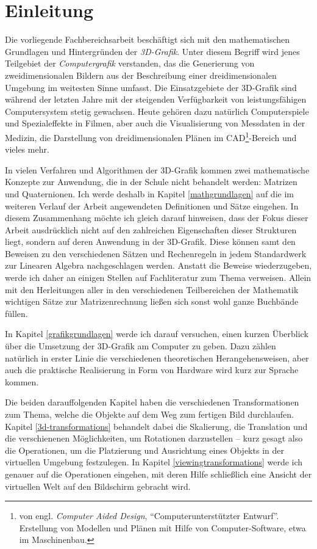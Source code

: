 \chapter{Einleitung}

Die vorliegende Fachbereichsarbeit beschäftigt sich mit den mathematischen Grundlagen und Hintergründen der \emph{3D-Grafik}. Unter diesem Begriff wird jenes Teilgebiet der \emph{Computergrafik} verstanden, das die Generierung von zweidimensionalen Bildern aus der Beschreibung einer dreidimensionalen Umgebung im weitesten Sinne umfasst. Die Einsatzgebiete der 3D-Grafik sind während der letzten Jahre mit der steigenden Verfügbarkeit von leistungsfähigen Computersystem stetig gewachsen. Heute gehören dazu natürlich Computerspiele und Spezialeffekte in Filmen, aber auch die Visualisierung von Messdaten in der Medizin, die Darstellung von dreidimensionalen Plänen im CAD\footnote{von engl. \emph{Computer Aided Design}, \enquote{Computerunterstützter Entwurf}. Erstellung von Modellen und Plänen mit Hilfe von Computer-Software, etwa im Maschinenbau.}-Bereich und vieles mehr.

In vielen Verfahren und Algorithmen der 3D-Grafik kommen zwei mathematische Konzepte zur Anwendung, die in der Schule nicht behandelt werden: Matrizen und Quaternionen. Ich werde deshalb in Kapitel \ref{mathgrundlagen} auf die im weiteren Verlauf der Arbeit angewendeten Definitionen und Sätze eingehen. In diesem Zusammenhang möchte ich gleich darauf hinweisen, dass der Fokus dieser Arbeit ausdrücklich nicht auf den zahlreichen Eigenschaften dieser Strukturen liegt, sondern auf deren Anwendung in der 3D-Grafik. Diese können samt den Beweisen zu den verschiedenen Sätzen und Rechenregeln in jedem Standardwerk zur Linearen Algebra nachgeschlagen werden. Anstatt die Beweise wiederzugeben, werde ich daher an einigen Stellen auf Fachliteratur zum Thema verweisen. Allein mit den Herleitungen aller in den verschiedenen Teilbereichen der Mathematik wichtigen Sätze zur Matrizenrechnung ließen sich sonst wohl ganze Buchbände füllen.

In Kapitel \ref{grafikgrundlagen} werde ich darauf versuchen, einen kurzen Überblick über die Umsetzung der 3D-Grafik am Computer zu geben. Dazu zählen natürlich in erster Linie die verschiedenen theoretischen Herangehensweisen, aber auch die praktische Realisierung in Form von Hardware wird kurz zur Sprache kommen.

Die beiden darauffolgenden Kapitel haben die verschiedenen Transformationen zum Thema, welche die Objekte auf dem Weg zum fertigen Bild durchlaufen. Kapitel \ref{3d-transformations} behandelt dabei die Skalierung, die Translation und die verschienenen Möglichkeiten, um Rotationen darzustellen -- kurz gesagt also die Operationen, um die Platzierung und Ausrichtung eines Objekts in der virtuellen Umgebung festzulegen. In Kapitel \ref{viewingtransformations} werde ich genauer auf die Operationen eingehen, mit deren Hilfe schließlich eine Ansicht der virtuellen Welt auf den Bildschirm gebracht wird.

